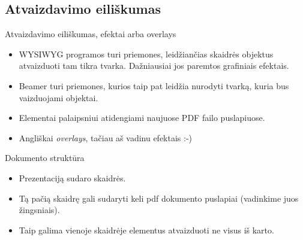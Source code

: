 \documentclass[11pt,a4paper]{beamer}
\begin{document}
\subsection{Atvaizdavimo eiliškumas}
\begin{frame}{Atvaizdavimo eiliškumas, efektai arba overlays}
	\begin{itemize}
		\item WYSIWYG programos turi priemones, leidžiančias skaidrės objektus atvaizduoti tam tikra tvarka. Dažniausiai jos paremtos grafiniais efektais.
		\item Beamer turi priemones, kurios taip pat leidžia nurodyti tvarką, kuria bus vaizduojami objektai.		
		\item Elementai palaipsniui atidengiami naujuose PDF failo puslapiuose.
		\item Angliškai \textit{overlays}, tačiau aš vadinu efektais :-)
	\end{itemize}
\end{frame}

\begin{frame}{Dokumento struktūra}
	\begin{itemize}
		\item Prezentaciją sudaro skaidrės.
		\item Tą pačią skaidrę gali sudaryti keli pdf dokumento puslapiai (vadinkime juos žingsniais).
		\item Taip galima vienoje skaidrėje elementus atvaizduoti ne visus iš karto.
	\end{itemize}
\end{frame}
\end{document}
